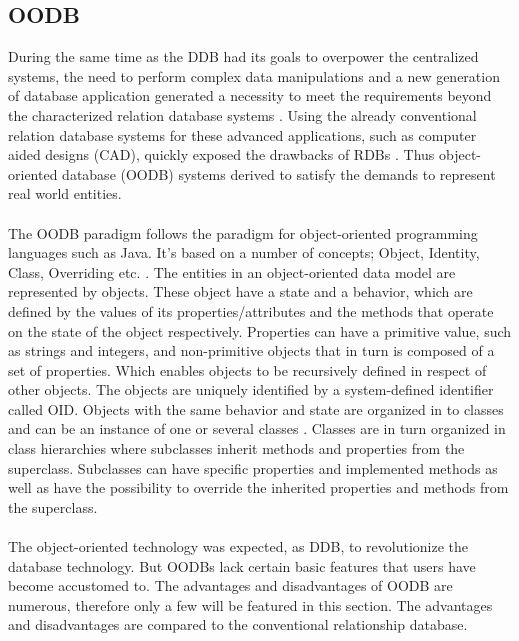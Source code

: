 \documentclass{cslthse-msc}
\begin{document}
\subsection{OODB}
During the same time as the DDB had its goals to overpower the centralized systems, the need to perform complex data manipulations and a new generation of database application generated a necessity to meet the requirements beyond the characterized relation database systems \cite{OODBMS}. Using the already conventional relation database systems for these advanced applications, such as computer aided designs (CAD), quickly exposed the drawbacks of RDBs \cite{OODBMSshortcomings}. Thus object-oriented database (OODB) systems derived to satisfy the demands to represent real world entities.\\\\
The OODB paradigm follows the paradigm for object-oriented programming languages such as Java. It's based on a number of concepts; Object, Identity, Class, Overriding etc. \cite{OODBMSparadigms}. The entities in an object-oriented data model are represented by objects. These object have a state and a behavior, which are defined by the values of its properties/attributes and the methods that operate on the state of the object respectively. Properties can have a primitive value, such as strings and integers, and non-primitive objects that in turn is composed of a set of properties. Which enables objects to be recursively defined in respect of other objects. The objects are uniquely identified by a system-defined identifier called OID. Objects with the same behavior and state are organized in to classes and can be  an instance of one or several classes \cite{OODBMSclasses}. Classes are in turn organized in class hierarchies where subclasses inherit methods and properties from the superclass. Subclasses can have specific properties and implemented methods as well as have the possibility to override the inherited properties and methods from the superclass.\\\\
The object-oriented technology was expected, as DDB, to revolutionize the database technology. But OODBs lack certain basic features that users have become accustomed to. 
The advantages and disadvantages of OODB are numerous, therefore only a few will be featured in this section. The advantages and disadvantages are compared to the conventional relationship database.
\end{document}
